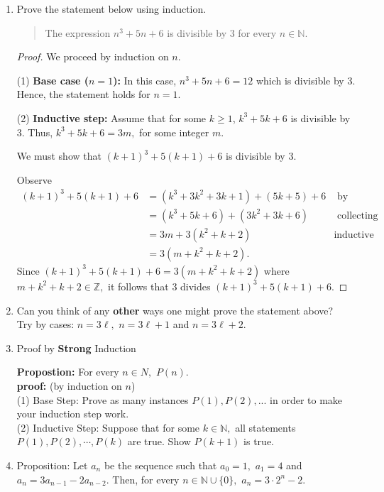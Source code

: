 \documentclass[12pt]{article}
\renewcommand{\emph}[1]{\textsf{\textbf{#1}}}
\newcommand{\N}{\mathbb{N}}
\newcommand{\Z}{\mathbb{Z}}
\begin{document}
\begin{enumerate}
\item Prove the statement below using induction. 
\begin{quote} The expression $n^3+5n+6$ is divisible by 3 for every $n \in \N.$\end{quote}

\begin{proof} We proceed by induction on $n$.

\medskip\noindent(1) \textbf{Base case ($n=1$):} In this case, $n^3+5n+6=12$ which is divisible by 3.
Hence, the statement holds for $n=1$.

\medskip\noindent(2) \textbf{Inductive step:}
Assume that for some $k\geq 1$, $k^3+5k+6$ is divisible by 3. Thus, $k^3+5k+6=3m,$ for some integer $m.$

We must show that $(k+1)^3+5(k+1)+6$ is divisible by 3. 

Observe\\
\begin{align*}
  (k+1)^3+5(k+1)+6
  &=(k^3+3k^2+3k+1) + (5k+5)+6&\text{ by expansion}\\
  &= (k^3+5k+6)+(3k^2+3k+6)& \text{ collecting terms}\\
  &= 3m +3(k^2+k+2)& \text{inductive hypothesis, factoring}\\
 &= 3(m + k^2+k+2).& 
\end{align*}
Since $(k+1)^3+5(k+1)+6=3(m + k^2+k+2)$ where $m + k^2+k+2 \in \Z,$ it follows that $3$ divides $(k+1)^3+5(k+1)+6.$
\end{proof}

\item Can you think of any \emph{other} ways one might prove the statement above?\\
Try by cases: $n=3\ell,$ $n=3\ell+1$ and $n=3\ell+2.$
\vspace{.5in}
\item Proof by \emph{Strong} Induction

{\textbf{Propostion:} }For every $n \in N,$ $P(n).$ \\

\textbf{proof:} (by induction on $n$)\\
(1) Base Step: Prove as many instances $P(1), P(2), ...$ in order to make your induction step work.\\
(2) Inductive Step: Suppose that for some $k \in \N,$ all statements $P(1), P(2), \cdots, P(k)$ are true. Show $P(k+1)$ is true.

\item Proposition: Let $a_n$ be the sequence such that $a_0=1,$ $a_1=4$ and $a_n=3a_{n-1}-2a_{n-2}.$ Then, for every $n \in \N \cup \{0\},$ $a_n=3 \cdot 2^n-2.$


\end{enumerate}
\end{document}
